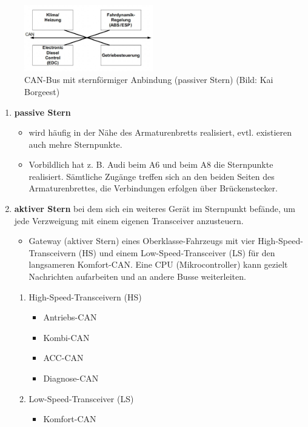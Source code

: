 \begin{figure}[!ht]%
\centering
\includegraphics[width=0.5\textwidth]{images/CAN/CAN-7.pdf}
\caption{CAN-Bus mit sternförmiger Anbindung (passiver Stern) (Bild: Kai
Borgeest)}
\end{figure}

\begin{enumerate}
\item
  \textbf{passive Stern}

  \begin{itemize}
  \item
    wird häufig in der Nähe des Armaturenbretts realisiert, evtl.
    existieren auch mehre Sternpunkte.
  \item
    Vorbildlich hat z. B. Audi beim A6 und beim A8 die Sternpunkte
    realisiert. Sämtliche Zugänge treffen sich an den beiden Seiten des
    Armaturenbrettes, die Verbindungen erfolgen über Brückenstecker.
  \end{itemize}
\item
  \textbf{aktiver Stern} bei dem sich ein weiteres Gerät im Sternpunkt
  befände, um jede Verzweigung mit einem eigenen Transceiver
  anzusteuern.

  \begin{itemize}
  \item
    Gateway (aktiver Stern) eines Oberklasse-Fahrzeugs mit vier
    High-Speed-Transceivern (HS) und einem Low-Speed-Transceiver (LS)
    für den langsameren Komfort-CAN. Eine CPU (Mikrocontroller) kann
    gezielt Nachrichten aufarbeiten und an andere Busse weiterleiten.
  \end{itemize}

  \begin{enumerate}
  \def\labelenumii{\arabic{enumii}.}
  \item
    High-Speed-Transceivern (HS)

    \begin{itemize}
    \item
      Antriebs-CAN
    \item
      Kombi-CAN
    \item
      ACC-CAN
    \item
      Diagnose-CAN
    \end{itemize}
  \item
    Low-Speed-Transceiver (LS)

    \begin{itemize}
    \item
      Komfort-CAN
    \end{itemize}
  \end{enumerate}
\end{enumerate}

